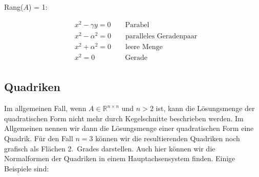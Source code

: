 Rang(\( A \)) = 1:

\begin{equation*}
    \begin{aligned}
        & x^2 - \gamma y = 0 \qquad \text{Parabel} \\
        & x^2 - \alpha^2 = 0 \qquad \text{paralleles Geradenpaar} \\
        & x^2 + \alpha^2 = 0 \qquad \text{leere Menge} \\
        & x^2 = 0 \qquad \qquad \ \text{Gerade} \\
    \end{aligned}
\end{equation*}

\subsection{Quadriken}

Im allgemeinen Fall, wenn \( A \in \mathbb{R}^{n \times n} \) und \( n > 2 \) ist, kann die Lösungsmenge der quadratischen Form nicht mehr durch Kegelschnitte beschrieben werden. Im Allgemeinen nennen wir dann die Lösungsmenge einer quadratischen Form eine Quadrik. Für den Fall \( n = 3 \) können wir die resultierenden Quadriken noch grafisch als Flächen 2.\ Grades darstellen. Auch hier können wir die Normalformen der Quadriken in einem Hauptachsensystem finden. Einige Beispiele sind:

\vspace{0.5\baselineskip}

